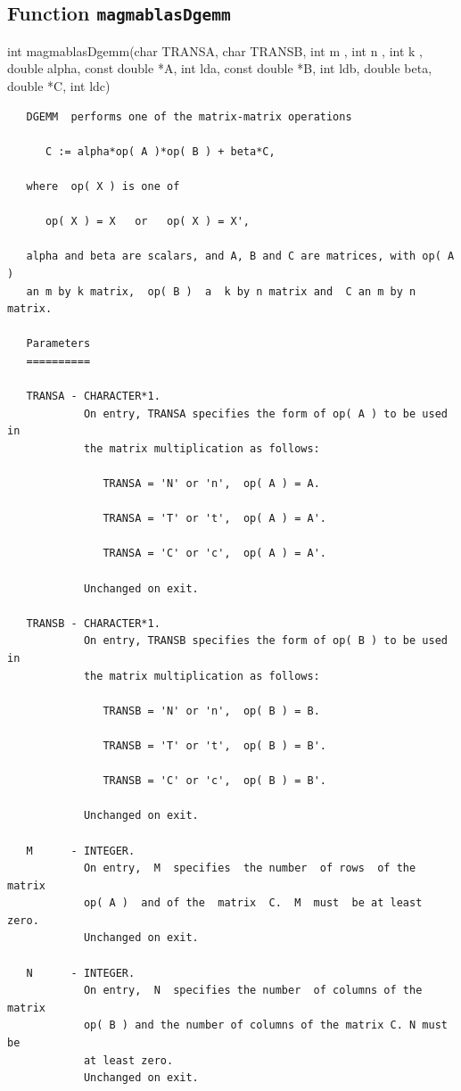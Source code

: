 \documentclass[10pt]{book}
\begin{document}
\subsection{Function {\tt {\bf magmablasDgemm}}}
int 
magmablasDgemm(char TRANSA, char TRANSB, int m , int n , int k , double alpha, const double *A, int lda, const double *B, int ldb, double beta, double *C, int ldc)

\begin{verbatim}
   DGEMM  performs one of the matrix-matrix operations
 
      C := alpha*op( A )*op( B ) + beta*C,
 
   where  op( X ) is one of
 
      op( X ) = X   or   op( X ) = X',
 
   alpha and beta are scalars, and A, B and C are matrices, with op( A )
   an m by k matrix,  op( B )  a  k by n matrix and  C an m by n matrix.
 
   Parameters
   ==========
 
   TRANSA - CHARACTER*1.
            On entry, TRANSA specifies the form of op( A ) to be used in
            the matrix multiplication as follows:
 
               TRANSA = 'N' or 'n',  op( A ) = A.
 
               TRANSA = 'T' or 't',  op( A ) = A'.
 
               TRANSA = 'C' or 'c',  op( A ) = A'.
 
            Unchanged on exit.
 
   TRANSB - CHARACTER*1.
            On entry, TRANSB specifies the form of op( B ) to be used in
            the matrix multiplication as follows:
 
               TRANSB = 'N' or 'n',  op( B ) = B.
 
               TRANSB = 'T' or 't',  op( B ) = B'.
 
               TRANSB = 'C' or 'c',  op( B ) = B'.
 
            Unchanged on exit.
 
   M      - INTEGER.
            On entry,  M  specifies  the number  of rows  of the  matrix
            op( A )  and of the  matrix  C.  M  must  be at least  zero.
            Unchanged on exit.
 
   N      - INTEGER.
            On entry,  N  specifies the number  of columns of the matrix
            op( B ) and the number of columns of the matrix C. N must be
            at least zero.
            Unchanged on exit.
 

\end{verbatim}
\end{document}
